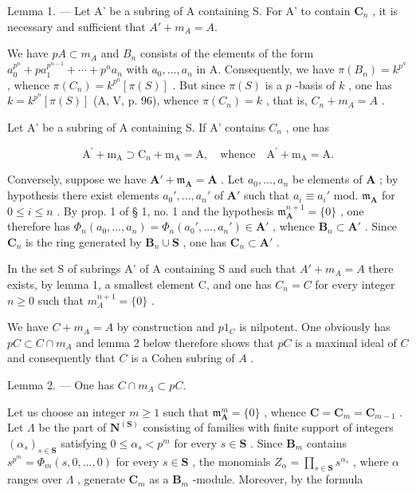 Lemma 1. --- Let A' be a subring of A containing S. For A' to contain \(\mathbf{C}_{n}\) , it is necessary and sufficient that \(A' + m_{A} = A\).

We have \(pA \subset m_A\) and \(B_n\) consists of the elements of the form \(a_0^{p^n} + pa_1^{p^{n-1}} + \cdots + p^n a_n\) with \(a_0, \ldots, a_n\) in A. Consequently, we have \(\pi(B_n) = k^{p^n}\) , whence \(\pi(C_n) = k^{p^n}[\pi(S)]\) . But since \(\pi(S)\) is a \(p\) -basis of \(k\) , one has \(k = k^{p^n}[\pi(S)]\) (A, V, p. 96), whence \(\pi(C_n) = k\) , that is, \(C_n + m_A = A\) .

Let A' be a subring of A containing S. If A' contains \(C_{n}\) , one has

\[
\mathrm{A} ^ {\prime} + \mathrm{m} _ {\mathrm{A}} \supset \mathrm{C} _ {n} + \mathrm{m} _ {\mathrm{A}} = \mathrm{A}, \quad \mathrm{whence} \quad \mathrm{A} ^ {\prime} + \mathrm{m} _ {\mathrm{A}} = \mathrm{A}.
\]

Conversely, suppose we have \(\mathbf{A}' + \mathfrak{m}_{\mathbf{A}} = \mathbf{A}\) . Let \(a_0, \ldots, a_n\) be elements of \(\mathbf{A}\) ; by hypothesis there exist elements \(a_0', \ldots, a_n'\) of \(\mathbf{A}'\) such that \(a_i \equiv a_i'\) mod. \(\mathfrak{m}_{\mathbf{A}}\) for \(0 \leqslant i \leqslant n\) . By prop. 1 of § 1, no. 1 and the hypothesis \(\mathfrak{m}_{\mathbf{A}}^{n+1} = \{0\}\) , one therefore has \(\Phi_n(a_0, \ldots, a_n) = \Phi_n(a_0', \ldots, a_n') \in \mathbf{A}'\) , whence \(\mathbf{B}_n \subset \mathbf{A}'\) . Since \(\mathbf{C}_n\) is the ring generated by \(\mathbf{B}_n \cup \mathbf{S}\) , one has \(\mathbf{C}_n \subset \mathbf{A}'\) .

In the set S of subrings A' of A containing S and such that \(A' + m_{A} = A\) there exists, by lemma 1, a smallest element C, and one has \(C_{n} = C\) for every integer \(n \geqslant 0\) such that \(m_{A}^{n+1} = \{0\}\) .

We have \(C + m_A = A\) by construction and \(p1_C\) is nilpotent. One obviously has \(pC \subset C \cap m_A\) and lemma 2 below therefore shows that \(pC\) is a maximal ideal of \(C\) and consequently that \(C\) is a Cohen subring of \(A\) .

Lemma 2. --- One has \(C \cap m_{A} \subset pC\).

Let us choose an integer \(m \geqslant 1\) such that \(\mathfrak{m}_{\mathbf{A}}^{m} = \{0\}\) , whence \(\mathbf{C} = \mathbf{C}_{m} = \mathbf{C}_{m-1}\) . Let \(\Lambda\) be the part of \(\mathbf{N}^{(\mathbf{S})}\) consisting of families with finite support of integers \((\alpha_{s})_{s \in \mathbf{S}}\) satisfying \(0 \leqslant \alpha_{s} < p^{m}\) for every \(s \in \mathbf{S}\) . Since \(\mathbf{B}_{m}\) contains \(s^{p^{m}} = \Phi_{m}(s, 0, ..., 0)\) for every \(s \in \mathbf{S}\) , the monomials \(Z_{\alpha} = \prod_{s \in \mathbf{S}} s^{\alpha_{s}}\) , where \(\alpha\) ranges over \(\Lambda\) , generate \(\mathbf{C}_{m}\) as a \(\mathbf{B}_{m}\) -module. Moreover, by the formula

